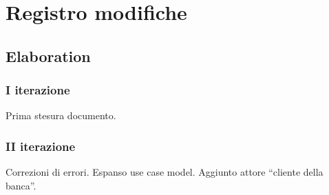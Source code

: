 \documentclass[10pt]{softeng} %
\begin{document}
\startofdocument{}











% 

\section{Registro modifiche}

\subsection{Elaboration}

\subsubsection{I iterazione}

Prima stesura documento.

\subsubsection{II iterazione}

Correzioni di errori.
Espanso use case model.
Aggiunto attore ``cliente della banca''.


\printcustombib{}

\end{document}
